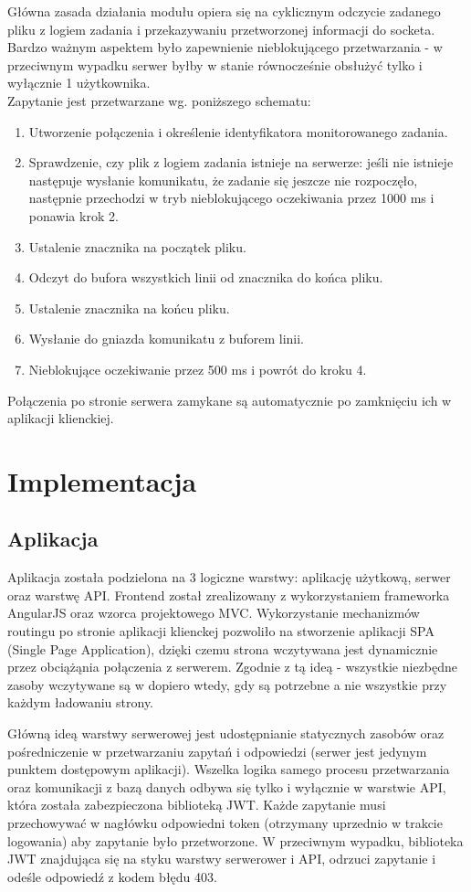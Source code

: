 \documentclass[a4paper,onecolumn,oneside,12pt]{memoir}
\begin{document}
{Główna zasada działania modułu opiera się na cyklicznym odczycie zadanego pliku z logiem
zadania i przekazywaniu przetworzonej informacji do socketa. Bardzo ważnym aspektem
było zapewnienie nieblokującego przetwarzania - w przeciwnym wypadku serwer byłby
w stanie równocześnie obsłużyć tylko i wyłącznie 1 użytkownika.\\

Zapytanie jest przetwarzane wg. poniższego schematu:
\begin{enumerate}
\item Utworzenie połączenia i określenie identyfikatora monitorowanego zadania.
\item Sprawdzenie, czy plik z logiem zadania istnieje na serwerze: jeśli nie istnieje
następuje wysłanie komunikatu, że zadanie się jeszcze nie rozpoczęło, następnie przechodzi w tryb nieblokującego
oczekiwania przez 1000 ms i ponawia krok 2.
\item Ustalenie znacznika na początek pliku.
\item Odczyt do bufora wszystkich linii od znacznika do końca pliku.
\item Ustalenie znacznika na końcu pliku.
\item Wysłanie do gniazda komunikatu z buforem linii.
\item Nieblokujące oczekiwanie przez 500 ms i powrót do kroku 4.
\end{enumerate}
Połączenia po stronie serwera zamykane są automatycznie po zamknięciu ich w aplikacji
klienckiej.

\chapter{Implementacja}
\section{Aplikacja}
\quad \quad Aplikacja została podzielona na 3 logiczne warstwy: aplikację użytkową, serwer oraz
warstwę API. Frontend został zrealizowany z wykorzystaniem frameworka AngularJS oraz wzorca projektowego MVC.
Wykorzystanie mechanizmów routingu po stronie aplikacji klienckej pozwoliło na stworzenie aplikacji SPA (Single
Page Application), dzięki czemu strona wczytywana jest dynamicznie przez obciążąnia połączenia z serwerem.
Zgodnie z tą ideą - wszystkie niezbędne zasoby wczytywane są w dopiero wtedy, gdy są potrzebne a nie
wszystkie przy każdym ładowaniu strony.

Główną ideą warstwy serwerowej jest udostępnianie statycznych zasobów oraz pośredniczenie w przetwarzaniu
zapytań i odpowiedzi (serwer jest jedynym punktem dostępowym aplikacji). Wszelka logika samego procesu przetwarzania
oraz komunikacji z bazą danych odbywa się tylko i wyłącznie w warstwie API, która została zabezpieczona biblioteką JWT.
Każde zapytanie musi przechowywać w nagłówku odpowiedni token (otrzymany uprzednio w trakcie logowania) aby zapytanie
było przetworzone. W przeciwnym wypadku, biblioteka JWT znajdująca się na styku warstwy serwerower i API, odrzuci
zapytanie i odeśle odpowiedź z kodem błędu 403.

}
\end{document}
